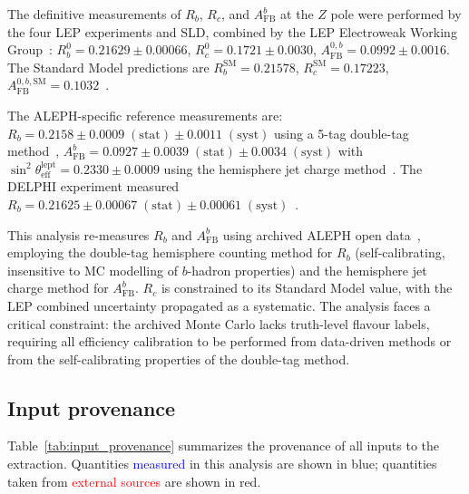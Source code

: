 \documentclass[11pt,a4paper]{article}
\newcommand{\measured}[1]{\textcolor{blue}{#1}}
\newcommand{\external}[1]{\textcolor{red}{#1}}
\begin{document}
The definitive measurements of $R_b$, $R_c$, and $A_\mathrm{FB}^b$ at the $Z$ pole
were performed by the four LEP experiments and SLD, combined by the LEP Electroweak
Working Group~\cite{LEP:EWWG:2005}:
$R_b^0 = 0.21629 \pm 0.00066$,
$R_c^0 = 0.1721 \pm 0.0030$,
$A_\mathrm{FB}^{0,b} = 0.0992 \pm 0.0016$.
The Standard Model predictions are
$R_b^\mathrm{SM} = 0.21578$,
$R_c^\mathrm{SM} = 0.17223$,
$A_\mathrm{FB}^{0,b,\mathrm{SM}} = 0.1032$~\cite{LEP:EWWG:2005}.

The ALEPH-specific reference measurements are:
$R_b = 0.2158 \pm 0.0009\;\mathrm{(stat)} \pm 0.0011\;\mathrm{(syst)}$ using
a 5-tag double-tag method~\cite{ALEPH:Rb:1996},
$A_\mathrm{FB}^b = 0.0927 \pm 0.0039\;\mathrm{(stat)} \pm 0.0034\;\mathrm{(syst)}$
with $\sin^2\theta_\mathrm{eff}^\mathrm{lept} = 0.2330 \pm 0.0009$ using
the hemisphere jet charge method~\cite{ALEPH:AFBb}.
The DELPHI experiment measured $R_b = 0.21625 \pm 0.00067\;\mathrm{(stat)} \pm 0.00061\;\mathrm{(syst)}$~\cite{DELPHI:Rb}.

This analysis re-measures $R_b$ and $A_\mathrm{FB}^b$ using archived ALEPH open
data~\cite{ALEPH:opendata}, employing the double-tag hemisphere counting method
for $R_b$ (self-calibrating, insensitive to MC modelling of $b$-hadron properties)
and the hemisphere jet charge method for $A_\mathrm{FB}^b$.
$R_c$ is constrained to its Standard Model value, with the LEP combined uncertainty
propagated as a systematic.
The analysis faces a critical constraint: the archived Monte Carlo lacks truth-level
flavour labels, requiring all efficiency calibration to be performed from data-driven
methods or from the self-calibrating properties of the double-tag method.

\subsection{Input provenance}
\label{sec:input_provenance}

Table~\ref{tab:input_provenance} summarizes the provenance of all inputs to the
extraction. Quantities \measured{measured} in this analysis are shown in blue;
quantities taken from \external{external sources} are shown in red.
\end{document}
